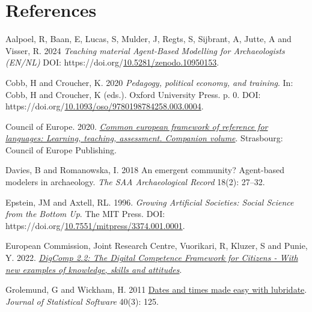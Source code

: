 \documentclass[
]{article}
\newlength{\cslhangindent}
\newlength{\cslentryspacingunit} %
\newenvironment{CSLReferences}[2] %
 {%
  \setlength{\parindent}{0pt}
  \ifodd #1
  \let\oldpar\par
  \def\par{\hangindent=\cslhangindent\oldpar}
  \fi
  \setlength{\parskip}{#2\cslentryspacingunit}
 }%
 {}
\begin{document}
\hypertarget{references}{%
\section*{References}\label{references}}

\hypertarget{refs}{}
\begin{CSLReferences}{1}{0}
\leavevmode{}%
Aalpoel, R, Baan, E, Lucas, S, Mulder, J, Regts, S, Sijbrant, A, Jutte, A and Visser, R. 2024 \emph{Teaching material Agent-Based Modelling for Archaeologists (EN/NL)} DOI: https://doi.org/\href{https://doi.org/10.5281/zenodo.10950153}{10.5281/zenodo.10950153}.

\leavevmode{}%
Cobb, H and Croucher, K. 2020 \emph{Pedagogy, political economy, and training}. In: Cobb, H and Croucher, K (eds.). Oxford University Press. p. 0. DOI: https://doi.org/\href{https://doi.org/10.1093/oso/9780198784258.003.0004}{10.1093/oso/9780198784258.003.0004}.

\leavevmode{}%
Council of Europe. 2020. \emph{\href{http://www.coe.int/lang-cefr}{Common european framework of reference for languages: Learning, teaching, assessment. Companion volume}}. Strasbourg: Council of Europe Publishing.

\leavevmode{}%
Davies, B and Romanowska, I. 2018 An emergent community? Agent-based modelers in archaeology. \emph{The SAA Archaeological Record} 18(2): 27--32.

\leavevmode{}%
Epstein, JM and Axtell, RL. 1996. \emph{Growing Artificial Societies: Social Science from the Bottom Up}. The MIT Press. DOI: https://doi.org/\href{https://doi.org/10.7551/mitpress/3374.001.0001}{10.7551/mitpress/3374.001.0001}.

\leavevmode{}%
European Commission, Joint Research Centre, Vuorikari, R, Kluzer, S and Punie, Y. 2022. \emph{\href{https://data.europa.eu/doi/10.2760/115376}{DigComp 2.2: The Digital Competence Framework for Citizens - With new examples of knowledge, skills and attitudes}}.

\leavevmode{}%
Grolemund, G and Wickham, H. 2011 \href{https://www.jstatsoft.org/v40/i03/}{Dates and times made easy with lubridate}. \emph{Journal of Statistical Software} 40(3): 125.


\end{CSLReferences}
\end{document}
